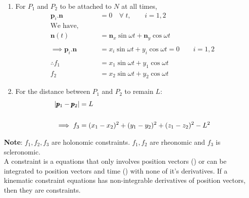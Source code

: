 \begin{enumerate}
    \item For $P_1$ and $P_2$ to be attached to $N$ at all times,
    \begin{align*}
        \pmb p_i .  \pmb n &= 0 \quad \forall \; t, \qquad i = 1, 2\\
        \text{We have, } \qquad &\\
        \pmb n(t) &= \pmb n_x \sin \omega t + \pmb n_y \cos \omega t\\
        \\
        \implies \pmb p_i .  \pmb n &= x_i \sin \omega t + y_i \cos \omega t = 0 \qquad i=1, 2\\
        \\
        \therefore f_1 &= x_1 \sin \omega t + y_1 \cos \omega t\\
                   f_2 &= x_2 \sin \omega t + y_2 \cos \omega t
    \end{align*}

    \item For the distance between $P_1$ and $P_2$ to remain $L$:
    \begin{align*}
        \left\lvert \pmb p_1 - \pmb p_2 \right\rvert &= L\\
        \\
        \implies f_3 &= (x_1 - x_2)^2 + (y_1 - y_2)^2 + (z_1 - z_2)^2 - L^2
    \end{align*}
\end{enumerate}

\textbf{Note}: $f_1, f_2, f_3$ are holonomic constraints. $f_1, f_2$ are rheonomic and $f_3$ is scleronomic.\\

A  constraint is a  equations that only involves position vectors () or can be integrated to position vectors and time () with none of it's derivatives. If a kinematic constraint equations has non-integrable derivatives of position vectors, then they are  constraints.
